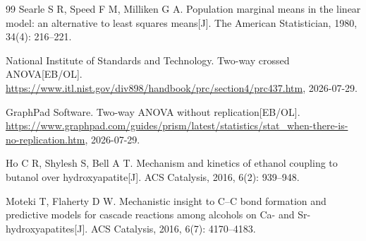 \begingroup
\sloppy
\begin{thebibliography}{99}
Searle S R, Speed F M, Milliken G A.
Population marginal means in the linear model: an alternative to least squares means[J].
The American Statistician, 1980, 34(4): 216--221.

National Institute of Standards and Technology.
Two-way crossed ANOVA[EB/OL].
\url{https://www.itl.nist.gov/div898/handbook/prc/section4/prc437.htm},
2026-07-29.

GraphPad Software.
Two-way ANOVA without replication[EB/OL].
\url{https://www.graphpad.com/guides/prism/latest/statistics/stat_when-there-is-no-replication.htm},
2026-07-29.

Ho C R, Shylesh S, Bell A T.
Mechanism and kinetics of ethanol coupling to butanol over hydroxyapatite[J].
ACS Catalysis, 2016, 6(2): 939--948.

Moteki T, Flaherty D W.
Mechanistic insight to C--C bond formation and predictive models for cascade reactions among
alcohols on Ca- and Sr-hydroxyapatites[J].
ACS Catalysis, 2016, 6(7): 4170--4183.
\end{thebibliography}
\endgroup
